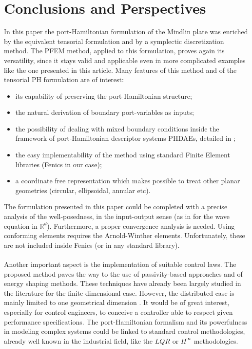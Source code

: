 \documentclass[11pt]{article}
\begin{document}
	
	\section*{Conclusions and Perspectives}
	
	In this paper the port-Hamiltonian formulation of the Mindlin plate was enriched by the equivalent tensorial formulation and by a symplectic discretization method. The PFEM method, applied to this formulation, proves again its versatility, since it stays valid and applicable even in more complicated examples like the one presented in this article. Many features of this method and of the tensorial PH formulation are of interest:
	\begin{itemize}
		\item its capability of preserving the port-Hamiltonian structure;
		\item the natural derivation of boundary port-variables as inputs;
		\item the possibility of dealing with mixed boundary conditions inside the framework of  port-Hamiltonian descriptor systems PHDAEs,  detailed in \cite{beattie2018linear};
		\item the easy implementability of the method using standard Finite Element libraries (Fenics \cite{LoggMardalEtAl2012} in our case);
		\item a coordinate free representation which makes possible to treat other planar geometries (circular, ellipsoidal, annular etc).
	\end{itemize}  
	The formulation presented in this paper could be completed with a precise analysis of the well-posedness, in the input-output sense (as in \cite{waveEqZwart} for the wave equation in $\mathbb{R}^d$). Furthermore, a proper convergence analysis is needed. Using conforming elements requires the Arnold-Winther elements. Unfortunately, these are not included inside Fenics (or in any standard library).  \\ \\
	Another important aspect is the implementation of suitable control laws. The proposed method paves the way to the use of passivity-based approaches and of energy shaping methods. These techniques have already been largely studied in the literature \cite{Ortega2002, OrtegaContrInt} for the finite-dimensional case. However, the distributed case is mainly limited to one geometrical dimension \cite{MaccContrDist}.  It would be of great interest, especially for control engineers, to conceive a controller able to respect given performance specifications. The port-Hamiltonian formalism and its powerfulness in modeling complex systems could be linked to standard control methodologies, already well known in the industrial field, like the $LQR$ or $H^\infty$ methodologies.   
	
\end{document}
